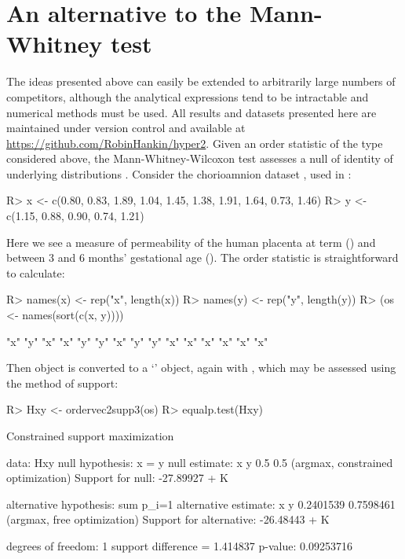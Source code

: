 \documentclass[article]{jss}
\begin{document}
\section{An alternative to the Mann-Whitney test}

The ideas presented above can easily be extended to arbitrarily large
numbers of competitors, although the analytical expressions tend to be
intractable and numerical methods must be used.  All results and
datasets presented here are maintained under version control and
available at \url{https://github.com/RobinHankin/hyper2}.  Given an
order statistic of the type considered above, the
Mann-Whitney-Wilcoxon test \citep{mann1947,wilcoxon1945} assesses a
null of identity of underlying distributions \citep{ahmad1996}.
Consider the chorioamnion dataset \citep{hollander2013}, used in
:
%
\begin{Schunk}
\begin{Sinput}
R> x <- c(0.80, 0.83, 1.89, 1.04, 1.45, 1.38, 1.91, 1.64, 0.73, 1.46)
R> y <- c(1.15, 0.88, 0.90, 0.74, 1.21)
\end{Sinput}
\end{Schunk}
%
Here we see a measure of permeability of the human placenta at term
() and between 3 and 6 months' gestational age ().
The order statistic is straightforward to calculate:
%
\begin{Schunk}
\begin{Sinput}
R> names(x) <- rep("x", length(x))
R> names(y) <- rep("y", length(y))
R> (os <- names(sort(c(x, y))))
\end{Sinput}
\begin{Soutput}
 [1] "x" "y" "x" "x" "y" "y" "x" "y" "y" "x" "x" "x" "x" "x" "x"
\end{Soutput}
\end{Schunk}
%
Then object  is converted to a `' object, again
with , which may be assessed using the method
of support:
%
\begin{Schunk}
\begin{Sinput}
R> Hxy <- ordervec2supp3(os)
R> equalp.test(Hxy)
\end{Sinput}
\begin{Soutput}
	Constrained support maximization

data:  Hxy
null hypothesis: x = y
null estimate:
  x   y 
0.5 0.5 
(argmax, constrained optimization)
Support for null:  -27.89927 + K

alternative hypothesis:  sum p_i=1 
alternative estimate:
        x         y 
0.2401539 0.7598461 
(argmax, free optimization)
Support for alternative:  -26.48443 + K

degrees of freedom: 1
support difference = 1.414837
p-value: 0.09253716 
\end{Soutput}
\end{Schunk}
\end{document}
